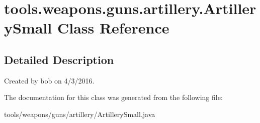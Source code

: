 \hypertarget{classtools_1_1weapons_1_1guns_1_1artillery_1_1_artillery_small}{}\section{tools.\+weapons.\+guns.\+artillery.\+Artillery\+Small Class Reference}
\label{classtools_1_1weapons_1_1guns_1_1artillery_1_1_artillery_small}


\subsection{Detailed Description}
Created by bob on 4/3/2016. 

The documentation for this class was generated from the following file\+:\begin{DoxyCompactItemize}
\item 
tools/weapons/guns/artillery/Artillery\+Small.\+java\end{DoxyCompactItemize}
